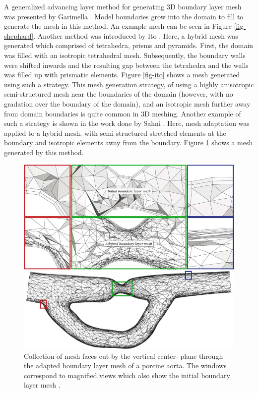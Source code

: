 A generalized advancing layer method for generating 3D boundary layer mesh was presented by Garimella \etal \cite{garimella2000boundary}. Model boundaries grow into the domain to fill to generate the mesh in this method. An example mesh can be seen in Figure \ref{fig-shephard}. Another method was introduced by Ito \etal \cite{ito2002unstructured}. Here, a hybrid mesh was generated which comprised of tetrahedra, prisms and pyramids. First, the domain was filled with an isotropic tetrahedral mesh. Subsequently, the boundary walls were shifted inwards and the resulting gap between the tetrahedra and the walls was filled up with prismatic elements. Figure \ref{fig-ito} shows a mesh generated using such a strategy. This mesh generation strategy, of using a highly anisotropic semi-structured mesh near the boundaries of the domain (however, with no gradation over the boundary of the domain), and an isotropic mesh further away from domain boundaries is quite common in 3D meshing. Another example of such a strategy is shown in the work done by Sahni \etal \cite{sahni2008adaptive}. Here, mesh adaptation was applied to a hybrid mesh, with semi-structured stretched elements at the boundary and isotropic elements away from the boundary. Figure \ref{fig-sahni} shows a mesh generated by this method.

\begin{figure}
	\centering
	\includegraphics[width=0.8\linewidth]{img/intro/lit/sahni.png}
	\caption{ Collection of mesh faces cut by the vertical center- plane through the adapted boundary layer mesh of a porcine aorta. The windows correspond to magnified views which also show the initial boundary layer mesh \cite{sahni2008adaptive}.}
	\label{fig-sahni}
\end{figure}

